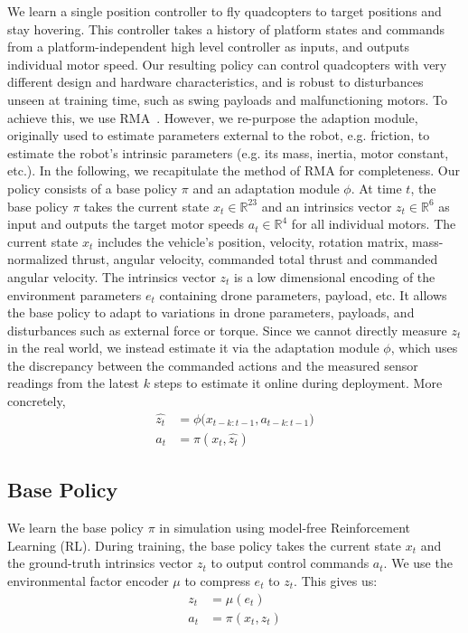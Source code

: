 We learn a single position controller to fly quadcopters to target positions and stay hovering. This controller takes a history of platform states and commands from a platform-independent high level controller as inputs, and outputs individual motor speed. Our resulting policy can control quadcopters with very different design and hardware characteristics, and is robust to disturbances unseen at training time, such as swing payloads and malfunctioning motors.
 To achieve this, we use RMA~\cite{kumar2021rma}. However, we re-purpose the adaption module, originally used to estimate parameters external to the robot, e.g. friction, to estimate the robot's intrinsic parameters (e.g. its mass, inertia, motor constant, etc.). In the following, we recapitulate the method of RMA for completeness. Our policy consists of a base policy $\pi$ and an adaptation module $\phi$. At time $t$, the base policy $\pi$ takes the current state $x_t \in \mathbb{R}^{23}$ and an intrinsics vector $z_t \in \mathbb{R}^6$ as input and outputs the target motor speeds $a_t \in \mathbb{R}^4$ for all individual motors. The current state $x_t$ includes the vehicle's position, velocity, rotation matrix, mass-normalized thrust, angular velocity, commanded total thrust and commanded angular velocity. The intrinsics vector $z_t$ is a low dimensional encoding of the environment parameters $e_t$ containing drone parameters, payload, etc. It allows the base policy to adapt to variations in drone parameters, payloads, and disturbances such as external force or torque. Since we cannot directly measure $z_t$ in the real world, we instead estimate it via the adaptation module $\phi$, which uses the discrepancy between the commanded actions and the measured sensor readings from the latest $k$ steps to estimate it online during deployment. More concretely, 
\begin{align}
    \hat{z_t} &=  \phi\big(x_{t-k:t-1}, a_{t-k:t-1}\big) \\
    a_t &= \pi(x_t, \hat{z_t}) \label{eq:pi}
\end{align}

\subsection{Base Policy}
We learn the base policy $\pi$ in simulation using model-free Reinforcement Learning (RL). During training, the base policy takes the current state $x_t$ and the ground-truth intrinsics vector $z_t$ to output control commands $a_t$. We use the environmental factor encoder $\mu$ to compress $e_t$ to $z_t$. This gives us:
\begin{align}
        z_t &= \mu(e_t) \\  
        a_t &= \pi(x_t, z_t)
\end{align}


